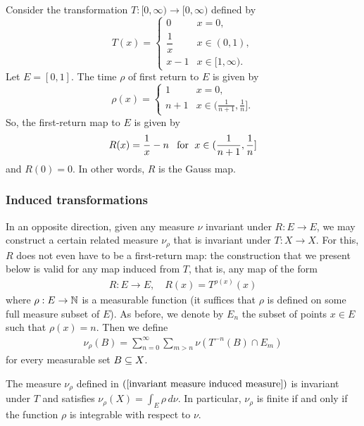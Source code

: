 \begin{example}
Consider the transformation $T:[0,\infty)\to [0,\infty)$ defined by
\[T(x)=\begin{cases}
0&x=0,\\[2pt]
\dfrac{1}{x}&x\in(0,1),\\[2pt]
x-1&x\in[1,\infty).
\end{cases}\]
Let $E=[0,1]$. The time $\rho$ of first return to $E$ is given by
\[\rho(x)=\begin{cases}
1&x=0,\\
n+1&x\in(\frac{1}{n+1},\frac{1}{n}].
\end{cases}\]
So, the first-return map to $E$ is given by
\[R(x)=\dfrac{1}{x}-n\hspace{8pt}\text{for}\hspace{6pt} x\in(\frac{1}{n+1},\frac{1}{n}]\]
and $R(0)=0$. In other words, $R$ is the Gauss map.
\end{example}
\subsubsection{Induced transformations}
In an opposite direction, given any measure $\nu$ invariant under $R:E\to E$, we may construct a certain related measure $\nu_\rho$ that is invariant under $T:X\to X$. For this, $R$ does not even have to be a first-return map: the construction that we present below is valid for any map induced from $T$, that is, any map of the form
\begin{align}\label{invariant measure induced map}
R:E\to E,\quad R(x)=T^{\rho(x)}(x)
\end{align}
where $\rho:E\to\mathbb{N}$ is a measurable function (it suffices that $\rho$ is defined on some full measure subset of $E$). As before, we denote by $E_n$ the subset of points $x\in E$ such that $\rho(x)=n$. Then we define
\begin{align}\label{invariant measure induced measure}
\nu_\rho(B)=\sum_{n=0}^{\infty}\sum_{m>n}\nu(T^{-n}(B)\cap E_m)
\end{align}
for every measurable set $B\subseteq X$.
\begin{proposition}
The measure $\nu_\rho$ defined in $(\ref{invariant measure induced measure})$ is invariant under $T$ and satisfies $\nu_\rho(X)=\int_E\rho\,d\nu$. In particular, $\nu_\rho$ is finite if and only if the function $\rho$ is integrable with respect to $\nu$.
\end{proposition}
